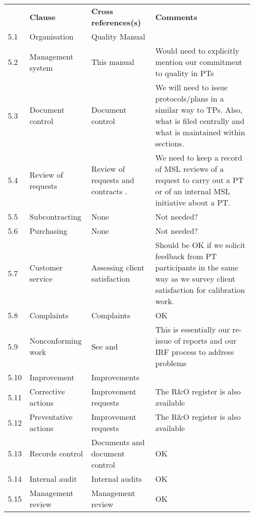 \begin{center}
{\renewcommand*{\arraystretch}{1.4}
\begin{tabular}{p{1em}p{10em}p{12em}p{16em}}
	\rowcolor[rgb]{ 0,  0,  0} 
	\textcolor[rgb]{ 1,  1,  1}{} & 
	\textcolor[rgb]{ 1,  1,  1}{\textbf{Clause}} & 
	\textcolor[rgb]{ 1,  1,  1}{\textbf{Cross references(s)}} &
	\textcolor[rgb]{ 1,  1,  1}{\textbf{Comments}} \\
5.1	& Organisation	& Quality Manual  \cite[\S\ref*{QM-s:organisation}]{MSL_Quality_Manual}  \\
5.2	&Management system	& This manual	&Would need to explicitly mention our commitment to quality in PTs \\
5.3	& Document control	& Document control\cite[\S\ref*{QM-s:documents_and_document_control}]{MSL_Quality_Manual} & We will need to issue protocols/plans in a similar way to TPs. Also, what is filed centrally and what is maintained within sections.\\
5.4	& Review of requests	& Review of requests and contracts \cite[\S\ref*{QM-s:requests_and_tenders}]{MSL_Quality_Manual} . 
& We need to keep a record of MSL reviews of a request to carry out a PT or of an internal MSL initiative about a PT.\\
5.5	& Subcontracting	& None	& Not needed? \\
5.6	& Purchasing	& None	& Not needed? \\
5.7	& Customer service	& Assessing client satisfaction \cite[\S\ref*{QM-ss:client_satisfaction}]{MSL_Quality_Manual} & Should be OK if we solicit feedback from PT participants in the same way as we survey client satisfaction for calibration work. \\
5.8	& Complaints	& Complaints \cite[\S\ref*{QM-ss:complaints}]{MSL_Quality_Manual} & OK\\

5.9	& Nonconforming work	& See \cite[\S\ref*{QM-ss:metrological_reports}]{MSL_Quality_Manual} and \cite[\S\ref*{QM-ss:improvement_requests}]{MSL_Quality_Manual} &
This is essentially our re-issue of reports and our IRF process to address problems \\
5.10	& Improvement	& Improvements  \cite[\S\ref*{QM-s:improvements}]{MSL_Quality_Manual}  \\
5.11	&Corrective actions	& Improvement requests  \cite[\S\ref*{QM-ss:improvement_requests}]{MSL_Quality_Manual} & The R\&O register is also available \\
5.12	& Preventative actions	& Improvement requests  \cite[\S\ref*{QM-ss:improvement_requests}]{MSL_Quality_Manual} & The R\&O register is also available \\
5.13	& Records control	& Documents and document control \cite[\S\ref*{QM-s:documents_and_document_control}]{MSL_Quality_Manual} & OK\\
5.14	& Internal audit	& Internal audits \cite[\S\ref*{QM-ss:internal_audit}]{MSL_Quality_Manual} & OK \\
5.15	& Management review	& Management review \cite[\S\ref*{QM-ss:management_review}]{MSL_Quality_Manual} & OK \\	
\end{tabular} } 
\end{center}

